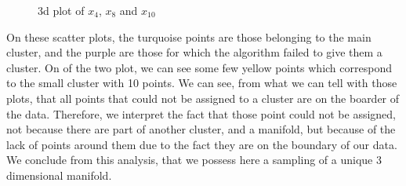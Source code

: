 \documentclass[11pt]{article}
\begin{document}
\begin{itemize}[label=\textbullet]
\begin{figure}
			\caption{3d plot of $x_4$, $x_8$ and $x_{10}$}
			\label{3dplots}
		\end{figure}
		On these scatter plots, the turquoise points are those belonging to the main cluster, and the purple are those for which the algorithm failed to give them a cluster. On of the two plot, we can see some few yellow points which correspond to the small cluster with 10 points. We can see, from what we can tell with those plots, that all points that could not be assigned to a cluster are on the boarder of the data. Therefore, we interpret the fact that those point could not be assigned, not because there are part of another cluster, and a manifold, but because of the lack of points around them due to the fact they are on the boundary of our data. We conclude from this analysis, that we possess here a sampling of a unique 3 dimensional manifold. 
		
	\end{itemize}
\end{document}
